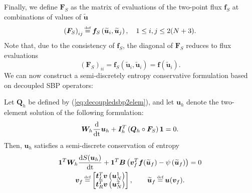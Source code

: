 \documentclass[onefignum,onetabnum,final]{siamart171218}
\renewcommand{\tilde}{\widetilde}
\newcommand{\td}[2]{\frac{{\rm d}#1}{{\rm d}{\rm #2}}}
\newcommand{\LRp}[1]{\left( #1 \right)}
\newcommand\myeq{\mathrel{\stackrel{\makebox[0pt]{\mbox{\normalfont\tiny def}}}{=}}}
\begin{document}
Finally, we define $\bm{F}_S$ as the matrix of evaluations of the two-point flux $\bm{f}_S$ at combinations of values of $\tilde{\bm{u}}$
\[
\LRp{\bm{F}_S}_{ij} \myeq \bm{f}_S\LRp{\tilde{\bm{u}}_i,\tilde{\bm{u}}_j}, \quad 1\leq i,j \leq 2(N+3).
\]
Note that, due to the consistency of $\bm{f}_S$, the diagonal of $\bm{F}_S$ reduces to flux evaluations
\begin{equation}
\label{eq:diagFS}
\LRp{\bm{F}_S}_{ii} = \bm{f}_S\LRp{\tilde{\bm{u}}_i,\tilde{\bm{u}}_i} = \bm{f}\LRp{\tilde{\bm{u}}_i}.  
\end{equation}
We can now construct a semi-discretely entropy conservative formulation based on decoupled SBP operators:
\begin{theorem}
\label{thm:consentropy}
Let $\bm{Q}_h$ be defined by (\ref{eq:decoupledsbp2elem}), and let $\bm{u}_h$ denote the two-element solution of the following formulation:
\begin{gather}
\label{eq:form}
\bm{W}_h \td{}{t} \bm{u}_h + \bm{I}_h^T\LRp{\bm{Q}_h \circ \bm{F}_S}\bm{1} = 0.
\end{gather}
Then, $\bm{u}_h$ satisfies a semi-discrete conservation of entropy
\begin{gather*}
\bm{1}^T\bm{W}_h\td{S(\bm{u}_h)}{t} + \bm{1}^T\bm{B}\LRp{\bm{v}_f^T\bm{f}(\tilde{\bm{u}}_f) - \psi\LRp{\tilde{\bm{u}}_f}} = 0\\
\bm{v}_f \myeq \begin{bmatrix}
\bm{t}_L^T \bm{v}\LRp{\bm{u}_N^1}\\
\bm{t}_R^T \bm{v}\LRp{\bm{u}_N^2}
\end{bmatrix}, \qquad \tilde{\bm{u}}_f \myeq \bm{u}(\bm{v}_f).
\end{gather*}
\end{theorem}
\end{document}
